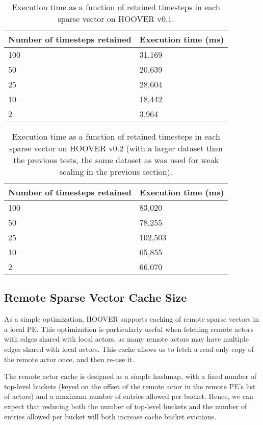\begin{table}
\centering
\begin{tabularx}{\textwidth}{ | X | X | }
\hline
Number of timesteps retained & Execution time (ms) \\\hline
100 & 31,169 \\\hline
50  & 20,639 \\\hline
25  & 28,604 \\\hline
10  & 18,442 \\\hline
2   & 3,964 \\\hline
\end{tabularx}
\caption{Execution time as a function of retained timesteps in each sparse vector on HOOVER v0.1.}
\label{tab:timesteps_retained1}
\end{table}

\begin{table}
\centering
\begin{tabularx}{\textwidth}{ | X | X | }
\hline
Number of timesteps retained & Execution time (ms) \\\hline
100 & 83,020 \\\hline
50  & 78,255 \\\hline
25  & 102,503 \\\hline
10  & 65,855 \\\hline
2   & 66,070 \\\hline
\end{tabularx}
\caption{Execution time as a function of retained timesteps in each sparse
    vector on HOOVER v0.2 (with a larger dataset than the previous tests, the
    same dataset as was used for weak scaling in the previous section).}
\label{tab:timesteps_retained2}
\end{table}

\subsection{Remote Sparse Vector Cache Size}

As a simple optimization, HOOVER supports caching of remote sparse vectors in a
local PE. This optimization is particularly useful when fetching remote actors
with edges shared with local actors, as many remote actors may have multiple
edges shared with local actors. This cache allows us to fetch a read-only copy
of the remote actor once, and then re-use it.

The remote actor cache is designed as a simple hashmap, with a fixed number of
top-level buckets (keyed on the offset of the remote actor in the remote PE's
list of actors) and a maximum number of entries allowed per bucket. Hence, we
can expect that reducing both the number of top-level buckets and the number of
entries allowed per bucket will both increase cache bucket evictions.

